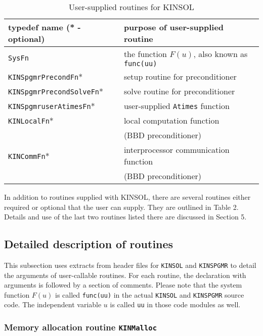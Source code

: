 \documentclass[11pt]{article}
\begin{document}
\begin{table}%
\begin{center}
\caption{User-supplied routines for KINSOL}
\label{user-supplied-routines}
\vspace{.1 in}
\begin{tabular}{|l|l|} \hline
typedef name  (* - optional) &  purpose of user-supplied routine \\ \hline \hline
{\tt SysFn} & the function ${F(u)}$, also known as {\tt func(uu)} \\  \hline
{\tt KINSpgmrPrecondFn}* & setup routine for preconditioner \\ \hline
{\tt KINSpgmrPrecondSolveFn}* & solve routine for preconditioner \\ \hline
{\tt KINSpgmruserAtimesFn}* & user-supplied {\tt Atimes} function \\ \hline
{\tt KINLocalFn}* & local computation function \\
 & (BBD preconditioner) \\ \hline
{\tt KINCommFn}* & interprocessor communication function \\
 & (BBD preconditioner) \\ \hline
\end{tabular}
\end{center}
\end{table}

In addition to routines supplied with KINSOL, there are several routines
either required or optional that the user can supply. They are outlined in
Table 2. Details and use of the last two routines listed there are discussed
in Section 5.


\subsection{Detailed description of routines}

This subsection uses extracts from header files for {\tt KINSOL} and 
{\tt KINSPGMR} to detail the arguments of user-callable routines. For each
routine, the declaration with arguments is followed by a section of comments. 
Please note that the system function ${F(u)}$ is called {\tt func(uu)} in the 
actual {\tt KINSOL} and {\tt KINSPGMR} source code. The independent variable 
$u$ is called {\tt uu} in those code modules as well.

\subsubsection{Memory allocation routine {\tt KINMalloc}}
\end{document}
